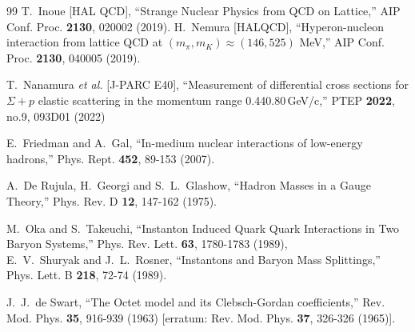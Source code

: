 \documentclass[aps,prd,showpacs,floatfix,reprint,nofootinbib]{revtex4-1}
\begin{document}
\begin{thebibliography}{99}
T.~Inoue [HAL QCD],
``Strange Nuclear Physics from QCD on Lattice,''
AIP Conf. Proc. \textbf{2130}, 020002 (2019).
H.~Nemura [HALQCD],
``Hyperon-nucleon interaction from lattice QCD at ${(m_\pi,m_K)\approx(146,525)}$ MeV,''
AIP Conf. Proc. \textbf{2130}, 040005 (2019).

T.~Nanamura \textit{et al.} [J-PARC E40],
``Measurement of differential cross sections for $\Sigma+p$ elastic scattering in the momentum range 0.44\textendash{}0.80\,GeV/c,''
PTEP \textbf{2022}, no.9, 093D01 (2022)


E.~Friedman and A.~Gal,
``In-medium nuclear interactions of low-energy hadrons,''
Phys. Rept. \textbf{452}, 89-153 (2007).

A.~De Rujula, H.~Georgi and S.~L.~Glashow,
``Hadron Masses in a Gauge Theory,''
Phys. Rev. D \textbf{12}, 147-162 (1975).

M.~Oka and S.~Takeuchi,
``Instanton Induced Quark Quark Interactions in Two Baryon Systems,''
Phys. Rev. Lett. \textbf{63}, 1780-1783 (1989),\\
E.~V.~Shuryak and J.~L.~Rosner,
``Instantons and Baryon Mass Splittings,''
Phys. Lett. B \textbf{218}, 72-74 (1989).


J.~J.~de Swart,
``The Octet model and its Clebsch-Gordan coefficients,''
Rev. Mod. Phys. \textbf{35}, 916-939 (1963)
[erratum: Rev. Mod. Phys. \textbf{37}, 326-326 (1965)].

\end{thebibliography}
\end{document}
